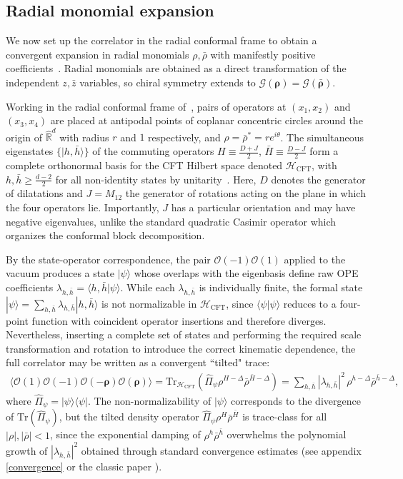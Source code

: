 \documentclass[a4paper,11pt]{article}
\theoremstyle{plain}
\theoremstyle{definition}
\theoremstyle{remark}
\newcommand{\bs}[1]{\boldsymbol{#1}}
\newcommand{\bh}{{\bar{h}}}
\newcommand{\rhob}{{\bar{\rho}}}
\newcommand{\cO}{\mathcal O}
\newcommand{\ba}{\begin{equation} \begin{aligned}}
\newcommand{\ea}{\end{aligned} \end{equation}}
\newcommand{\De}{\Delta}
\begin{document}
\subsection{Radial monomial expansion}
\label{radialmonomialdecomp}
 
We now set up the correlator in the radial conformal frame to obtain a convergent expansion in radial monomials $\rho,\bar{\rho}$ with manifestly positive coefficients~\cite{Hogervorst:2013sma,Hartman:2015lfa,Kravchuk:2020scc}. Radial monomials are obtained as a direct transformation of the independent $z,\bar{z}$ variables, so chiral symmetry extends to $\mathcal{G}(\bs{\rho}) = \mathcal{G}(\bar{\bs{\rho}})$.
 
Working in the radial conformal frame of~\cite{Hogervorst:2013sma}, pairs of operators at $(x_1,x_2)$ and $(x_3,x_4)$ are placed at antipodal points of coplanar concentric circles around the origin of $\widehat{\mathbb{R}}^d$ with radius $r$ and $1$ respectively, and $\rho= \rhob^* = r e^{ i\theta}$. The simultaneous eigenstates $\{|h,\bh\rangle\}$ of the commuting operators $H \equiv \frac{D+ J}{2}$, $\bar{H} \equiv \frac{D - J}{2}$ form a complete orthonormal basis for the CFT Hilbert space denoted $\mathcal{H}_{\mathrm{CFT}}$, with $h,\bh \geq \frac{d-2}{2}$ for all non-identity states by unitarity~\cite{Simmons-Duffin2016-nn}. Here, $D$ denotes the generator of dilatations and $J = M_{12}$ the generator of rotations acting on the plane in which the four operators lie. Importantly, $J$ has a particular orientation and may have negative eigenvalues, unlike the standard quadratic Casimir operator which organizes the conformal block decomposition.
 
By the state-operator correspondence, the pair $\cO(-1)\cO(1)$ applied to the vacuum produces a state $|\psi\rangle$ whose overlaps with the eigenbasis define raw OPE coefficients $\lambda_{h,\bh} = \langle h, \bh | \psi\rangle$. While each $\lambda_{h,\bh}$ is individually finite, the formal state $|\psi\rangle = \sum_{h,\bh} \lambda_{h,\bh} |h,\bh\rangle$ is not normalizable in $\mathcal{H}_{\mathrm{CFT}}$, since $\langle\psi|\psi\rangle$ reduces to a four-point function with coincident operator insertions and therefore diverges. Nevertheless, inserting a complete set of states and performing the required scale transformation and rotation to introduce the correct kinematic dependence, the full correlator may be written as a convergent ``tilted" trace:
\ba
\langle \cO(1) \cO(-1) \cO(-\bs{\rho}) \cO(\bs{\rho})\rangle = \mathrm{Tr}_{\mathcal{H}_{\mathrm{CFT}}}\!\left(\hat{\Pi}_\psi  \rho^{H - \De} \rhob^{\bar{H} - \De}\right) = \sum_{h,\bh} |\lambda_{h,\bh}|^2\, \rho^{h-\De}\rhob^{\bh-\De},
\label{twistedtrace}
\ea
where $\hat{\Pi}_\psi = |\psi\rangle\langle\psi|$.
The non-normalizability of $|\psi\rangle$ corresponds to the divergence of $\mathrm{Tr}(\hat{\Pi}_\psi)$, but the tilted density operator $\hat{\Pi}_\psi \rho^H \rhob^{\bar{H}}$ is trace-class for all $|\rho|,|\rhob| < 1$, since the exponential damping of $\rho^h \rhob^{\bh}$ overwhelms the polynomial growth of $|\lambda_{h,\bh}|^2$ obtained through standard convergence estimates (see appendix \ref{convergence} or the classic paper \cite{Pappadopulo:2012jk}).
\end{document}
